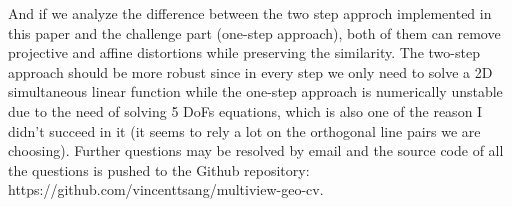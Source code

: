 \documentclass[conference]{IEEEtran}
\begin{document}
And if we analyze the difference between the two step approch implemented in this paper and the challenge part (one-step approach), both of them can remove projective and affine distortions while preserving the similarity. The two-step approach should be more robust since in every step we only need to solve a 2D simultaneous linear function while the one-step approach is numerically unstable due to the need of solving 5 DoFs equations, which is also one of the reason I didn't succeed in it (it seems to rely a lot on the orthogonal line pairs we are choosing). Further questions may be resolved by email and the source code of all the questions is pushed to the Github repository: https://github.com/vincenttsang/multiview-geo-cv.









%
%
%
%
%




\end{document}
